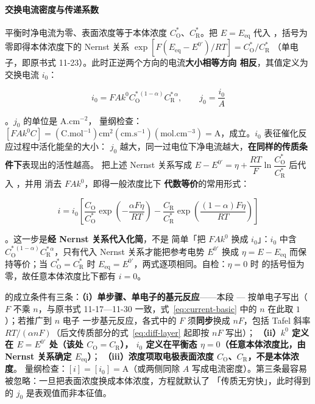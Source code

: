 \paragraph{交换电流密度与传递系数} 平衡时净电流为零、表面浓度等于本体浓度
$C_{\mathrm{O}}^*$、$C_{\mathrm{R}}^*$。把 $E=E_{\mathrm{eq}}$ 代入
，括号为零即得本体浓度下的 Nernst 关系
$\exp\!\left[F(E_{\mathrm{eq}}-E^{0'})/RT\right]=C_{\mathrm{O}}^*/C_{\mathrm{R}}^*$
（单电子，即原书式 11-23）。此时正逆两个方向的电流\textbf{大小相等方向
相反}，其值定义为交换电流 $i_0$：

\begin{equation}
i_0=FAk^0C_{\mathrm{O}}^{*\,(1-\alpha)}C_{\mathrm{R}}^{*\,\alpha},
\qquad
j_0=\frac{i_0}{A}
\label{eq:i0}
\end{equation}

。$j_0$ 的单位是 $\mathrm{A.cm^{-2}}$，
量纲检查：$[FAk^0C]=(\mathrm{C.mol^{-1}})\mathrm{cm^2}(\mathrm{cm.s^{-1}})
(\mathrm{mol.cm^{-3}})=\mathrm{A}$，成立。$i_0$ 表征催化反应过程中活化能垒的大小：
$j_0$ 越大，同一过电位下净电流越大，\textbf{在同样的传质条件下}表现出的活性越高。
把上述 Nernst 关系写成
$E-E^{0'}=\eta+\dfrac{RT}{F}\ln\dfrac{C_{\mathrm{O}}^*}{C_{\mathrm{R}}^*}$ 后代入
，并用  消去 $FAk^0$，即得一般浓度比下
\textbf{代数等价}的常用形式：

\begin{equation}
i=i_0\left[\frac{C_{\mathrm{O}}}{C_{\mathrm{O}}^*}
\exp\!\left(-\frac{\alpha F\eta}{RT}\right)
-\frac{C_{\mathrm{R}}}{C_{\mathrm{R}}^*}
\exp\!\left(\frac{(1-\alpha)F\eta}{RT}\right)\right]
\label{eq:bv}
\end{equation}

。这一步是\textbf{经 Nernst 关系代入化简}，不是
简单「把 $FAk^0$ 换成 $i_0$」：$i_0$ 中含 $C_{\mathrm{O}}^{*\,(1-\alpha)}
C_{\mathrm{R}}^{*\,\alpha}$，只有代入 Nernst 关系才能把参考电势 $E^{0'}$ 换成
$\eta=E-E_{\mathrm{eq}}$ 而保持等价；当 $C_{\mathrm{O}}^*=C_{\mathrm{R}}^*$ 时
$E_{\mathrm{eq}}=E^{0'}$，两式逐项相同。自检：$\eta=0$ 时  的括号恒为
零，故任意本体浓度比下都有 $i=0$。

\begin{keycond}
 的成立条件有三条：\textbf{（i）单步骤、单电子的基元反应}——本段
— 按单电子写出（$F$ 不乘 $n$，与原书式
11-17—11-30 一致，式~\eqref{eq:current-basic} 中的 $n$ 在此取 $1$）；若推广到 $n$ 电子
一步基元反应，各式中的 $F$ 须\textbf{同步}换成 $nF$，包括 Tafel 斜率
$RT/(\alpha nF)$（后文传质部分的式~\eqref{eq:diff-layer} 起即按 $nF$ 写出）；
\textbf{（ii）$k^0$ 定义在 $E=E^{0'}$ 处（该处 $C_{\mathrm{O}}=C_{\mathrm{R}}$），
$i_0$ 定义在平衡态 $\eta=0$（任意本体浓度比，由 Nernst 关系确定 $E_{\mathrm{eq}}$）}；
\textbf{（iii）浓度项取电极表面浓度 $C_{\mathrm{O}}$、$C_{\mathrm{R}}$，不是本体浓度}。
量纲检查：$[i]=[i_0]=\mathrm{A}$（或两侧同除 $A$
写成电流密度）。第三条最容易被忽略：一旦把表面浓度换成本体浓度，方程就默认了
「传质无穷快」，此时得到的 $j_0$ 是表观值而非本征值。
\end{keycond}

